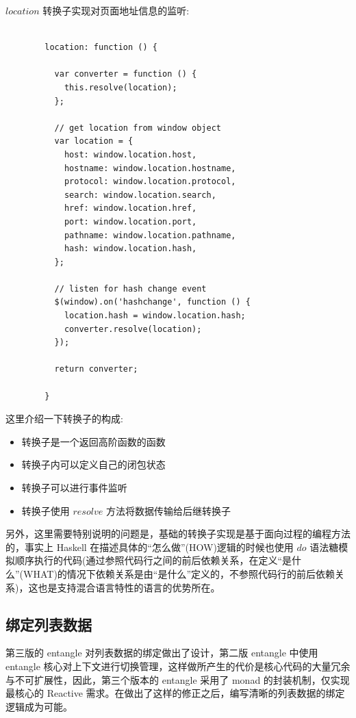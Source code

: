 $location$ 转换子实现对页面地址信息的监听:

\begin{verbatim}

        location: function () {

          var converter = function () {
            this.resolve(location);
          };

          // get location from window object
          var location = {
            host: window.location.host,
            hostname: window.location.hostname,
            protocol: window.location.protocol,
            search: window.location.search,
            href: window.location.href,
            port: window.location.port,
            pathname: window.location.pathname,
            hash: window.location.hash,
          };

          // listen for hash change event
          $(window).on('hashchange', function () {
            location.hash = window.location.hash;
            converter.resolve(location);
          });

          return converter;

        }

\end{verbatim}

这里介绍一下转换子的构成:

\begin{itemize}
  \item 转换子是一个返回高阶函数的函数
  \item 转换子内可以定义自己的闭包状态
  \item 转换子可以进行事件监听
  \item 转换子使用 $resolve$ 方法将数据传输给后继转换子
\end{itemize}

另外，这里需要特别说明的问题是，基础的转换子实现是基于面向过程的编程方法的，事实上 Haskell 在描述具体的“怎么做”(HOW)逻辑的时候也使用 $do$ 语法糖模拟顺序执行的代码(通过参照代码行之间的前后依赖关系，在定义“是什么”(WHAT)的情况下依赖关系是由“是什么”定义的，不参照代码行的前后依赖关系)，这也是支持混合语言特性的语言的优势所在。

\subsection{绑定列表数据}

第三版的 entangle 对列表数据的绑定做出了设计，第二版 entangle 中使用 entangle 核心对上下文进行切换管理，这样做所产生的代价是核心代码的大量冗余与不可扩展性，因此，第三个版本的 entangle 采用了 monad 的封装机制，仅实现最核心的 Reactive 需求。在做出了这样的修正之后，编写清晰的列表数据的绑定逻辑成为可能。

